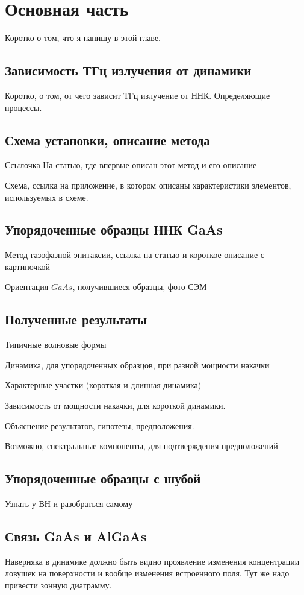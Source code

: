 \documentclass[a4paper,14pt,russian]{extreport}
\begin{document}
	\chapter{Основная часть}
			Коротко о том, что я напишу в этой главе.
		\section{Зависимость ТГц излучения от динамики}
			Коротко, о том, от чего зависит ТГц излучение от ННК. Определяющие процессы.	
		\section{Схема установки, описание метода}
			Ссылочка На статью, где впервые описан этот метод и его описание\par	
			Схема, ссылка на приложение, в котором описаны характеристики элементов, используемых в схеме.\par
		\section{Упорядоченные образцы ННК GaAs}
			Метод газофазной эпитаксии, ссылка на статью и короткое описание с картиночкой\par
			Ориентация $GaAs$, получившиеся образцы, фото СЭМ
		\section{Полученные результаты}
			Типичные волновые формы\par
			Динамика, для упорядоченных образцов, при разной мощности накачки\par
			Характерные участки (короткая и длинная динамика) \par
			Зависимость от мощности накачки, для короткой динамики.\par
			Объяснение результатов, гипотезы, предположения.\par
			Возможно, спектральные компоненты, для подтверждения предположений
		\section{Упорядоченные образцы с шубой}
			Узнать у ВН и разобраться самому
		\section{Связь GaAs и AlGaAs}
			Наверняка в динамике должно быть видно проявление изменения концентрации ловушек на поверхности и вообще 					изменения встроенного поля. Тут же надо привести зонную диаграмму.
\end{document}
